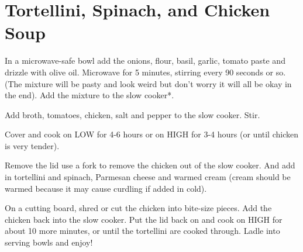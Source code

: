 \section{Tortellini, Spinach, and Chicken Soup}
\begin{recipe}





In a microwave-safe bowl add the onions, flour, basil, garlic, tomato paste and drizzle with olive oil. Microwave for 5 minutes, stirring every 90 seconds or so. (The mixture will be pasty and look weird but don’t worry it will all be okay in the end). Add the mixture to the slow cooker*.

Add broth, tomatoes, chicken, salt and pepper to the slow cooker. Stir.

Cover and cook on LOW for 4-6 hours or on HIGH for 3-4 hours (or until chicken is very tender).

Remove the lid use a fork to remove the chicken out of the slow cooker.  And add in tortellini and spinach, Parmesan cheese and warmed cream (cream should be warmed because it may cause curdling if added in cold).

On a cutting board, shred or cut the chicken into bite-size pieces. Add the chicken back into the slow cooker. Put the lid back on and cook on HIGH for about 10 more minutes, or until the tortellini are cooked through. Ladle into serving bowls and enjoy!


\end{recipe}
